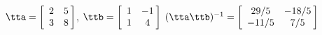 {$\tta = \left[
\begin{array}{cc}
 2 & 5 \\
 3 & 8 
\end{array}\hskip -3pt \right]$, \quad 
$\ttb = \left[
\begin{array}{cc}
 1 & -1 \\
 1 & 4
\end{array} \hskip -3pt
\right]$}
{$(\tta\ttb)^{-1} = \left[
\begin{array}{cc}
  29/5 & -18/5 \\
  -11/5 & 7/5
\end{array} \hskip -3pt
\right]$}
